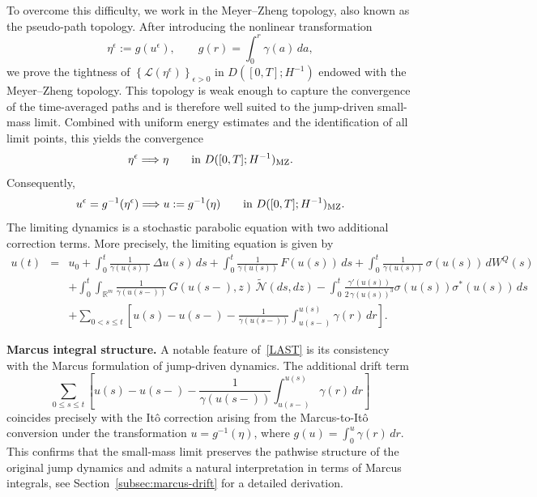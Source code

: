 \documentclass[11pt]{article}
\theoremstyle{plain}
\numberwithin{equation}{section}
\begin{document}
To overcome this difficulty, we work in the Meyer--Zheng topology, also known as the pseudo-path topology. After introducing the nonlinear
transformation
\[
\eta^\epsilon:=g(u^\epsilon), \qquad g(r)=\int_0^r \gamma(a)\,da,
\]
we prove the tightness of \(\left\{\mathcal L(\eta^\epsilon)\right\}_{\epsilon>0}\) in \(D([0,T];H^{-1})\) endowed with the Meyer--Zheng topology. This topology
is weak enough to capture the convergence of the time-averaged paths and is therefore well suited to the jump-driven small-mass limit. Combined with
uniform energy estimates and the identification of all limit points, this yields the convergence
\[
\eta^\epsilon \Longrightarrow\eta\qquad\text{in }D([0,T];H^{-1})_{\rm MZ}.
\]
Consequently,
\[
u^\epsilon=g^{-1}(\eta^\epsilon)\Longrightarrow u:=g^{-1}(\eta) \qquad \text{in }D([0,T];H^{-1})_{\rm MZ}.
\]
The limiting dynamics is a stochastic parabolic equation with two additional
correction terms. More precisely, the limiting equation is given by
\begin{eqnarray}\label{LAST}
u(t) &=& u_0
+ \int_0^t \frac{1}{\gamma(u(s))}\,\Delta u(s)\,ds
+ \int_0^t \frac{1}{\gamma(u(s))}\,F(u(s))\,ds
+ \int_0^t \frac{1}{\gamma(u(s))}\,\sigma(u(s))\,dW^Q(s) \nonumber\\
&&+ \int_0^t\int_{\mathbb R^m}
\frac{1}{\gamma(u(s-))}\,G(u(s-),z)\,\tilde{\mathcal N}(ds,dz)
- \int_0^t
\frac{\gamma'(u(s))}{2\,\gamma(u(s))^3}
\sigma(u(s))\sigma^\ast(u(s))\,ds
\nonumber\\
&&+ \sum_{0<s\le t}
\left[
u(s)-u(s-)
-\frac{1}{\gamma(u(s-))}
\int_{u(s-)}^{u(s)} \gamma(r)\,dr
\right].
\end{eqnarray}


  
 

\medskip
\noindent\textbf{Marcus integral structure.}
A notable feature of~\eqref{LAST} is its consistency with the Marcus formulation of jump-driven dynamics. The additional drift term
\[
\sum_{0\le s\le t}
\left[
u(s)-u(s-)
-\frac{1}{\gamma(u(s-))}
\int_{u(s-)}^{u(s)} \gamma(r)\,dr
\right]
\]
coincides precisely with the It\^o correction arising from the Marcus-to-It\^o conversion under the transformation $u = g^{-1}(\eta)$, where $g(u) = \int_0^u \gamma(r)\,dr$.  
 This confirms that the small-mass limit preserves the pathwise structure of the original jump dynamics and admits a natural interpretation in terms of Marcus integrals,  see Section~\ref{subsec:marcus-drift}  for a detailed derivation.
 
 
 
\end{document}
